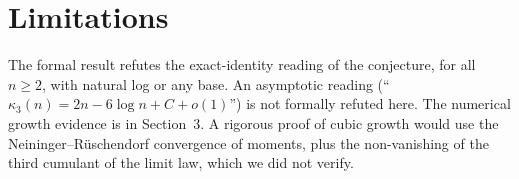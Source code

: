 \documentclass[11pt]{article}
\theoremstyle{definition}
\theoremstyle{plain}
\begin{document}
\section*{Limitations}
The formal result refutes the exact-identity reading of the conjecture, for all $n\ge 2$, with natural log or any base.
An asymptotic reading (``$\kappa_3(n)=2n-6\log n+C+o(1)$'') is not formally refuted here. The numerical growth evidence
is in Section~3. A rigorous proof of cubic growth would use the Neininger--R\"uschendorf convergence of moments, plus
the non-vanishing of the third cumulant of the limit law, which we did not verify.
\end{document}
